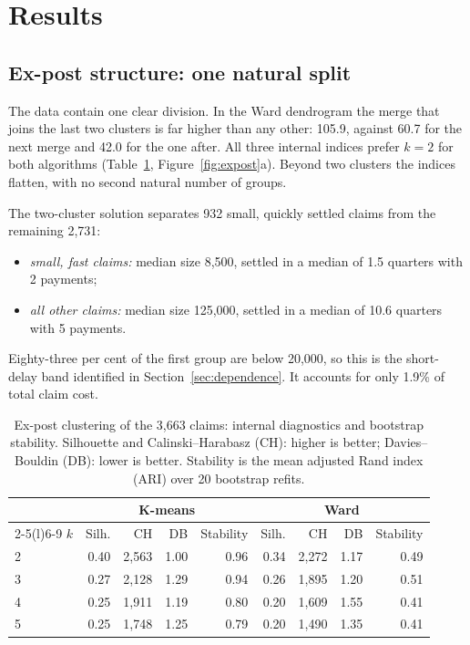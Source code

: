 \section{Results}
\label{results}

\subsection{Ex-post structure: one natural split}
\label{sec:res-expost}

The data contain one clear division. In the Ward dendrogram the merge that joins the last two clusters is far higher than any other: 105.9, against 60.7 for the next merge and 42.0 for the one after. All three internal indices prefer $k=2$ for both algorithms (Table~\ref{tab:expost}, Figure~\ref{fig:expost}a). Beyond two clusters the indices flatten, with no second natural number of groups.

The two-cluster solution separates 932 small, quickly settled claims from the remaining 2,731:
\begin{itemize}[leftmargin=*]
\item \emph{small, fast claims:} median size 8,500, settled in a median of 1.5 quarters with 2 payments;
\item \emph{all other claims:} median size 125,000, settled in a median of 10.6 quarters with 5 payments.
\end{itemize}
Eighty-three per cent of the first group are below 20,000, so this is the short-delay band identified in Section~\ref{sec:dependence}. It accounts for only 1.9\% of total claim cost.

\begin{table}[!htbp]
\centering
\small
\caption{Ex-post clustering of the 3,663 claims: internal diagnostics and bootstrap stability. Silhouette and Calinski--Harabasz (CH): higher is better; Davies--Bouldin (DB): lower is better. Stability is the mean adjusted Rand index (ARI) over 20 bootstrap refits.}
\label{tab:expost}
\begin{tabular}{@{}lrrrrrrrr@{}}
\toprule
 & \multicolumn{4}{c}{K-means} & \multicolumn{4}{c}{Ward} \\
\cmidrule(lr){2-5}\cmidrule(l){6-9}
$k$ & Silh. & CH & DB & Stability & Silh. & CH & DB & Stability \\
\midrule
2 & 0.40 & 2,563 & 1.00 & 0.96 & 0.34 & 2,272 & 1.17 & 0.49 \\
3 & 0.27 & 2,128 & 1.29 & 0.94 & 0.26 & 1,895 & 1.20 & 0.51 \\
4 & 0.25 & 1,911 & 1.19 & 0.80 & 0.20 & 1,609 & 1.55 & 0.41 \\
5 & 0.25 & 1,748 & 1.25 & 0.79 & 0.20 & 1,490 & 1.35 & 0.41 \\
\bottomrule
\end{tabular}
\end{table}

